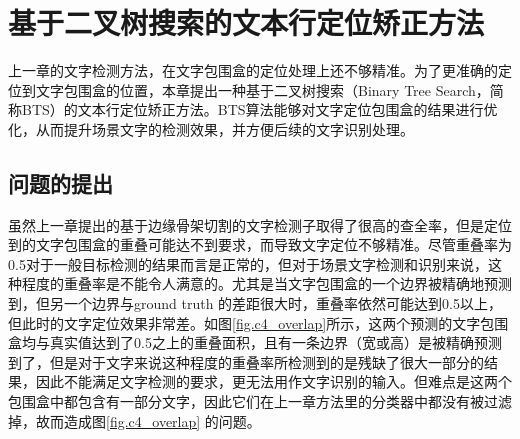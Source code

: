 ﻿%
%
%
%
%
%

\chapter{基于二叉树搜索的文本行定位矫正方法}

    上一章的文字检测方法，在文字包围盒的定位处理上还不够精准。为了更准确的定位到文字包围盒的位置，本章提出一种基于二叉树搜索（Binary Tree Search，简称BTS）的文本行定位矫正方法。BTS算法能够对文字定位包围盒的结果进行优化，从而提升场景文字的检测效果，并方便后续的文字识别处理。

    \section{问题的提出}

    虽然上一章提出的基于边缘骨架切割的文字检测子取得了很高的查全率，但是定位到的文字包围盒的重叠可能达不到要求，而导致文字定位不够精准。尽管重叠率为0.5对于一般目标检测的结果而言是正常的，但对于场景文字检测和识别来说，这种程度的重叠率是不能令人满意的。尤其是当文字包围盒的一个边界被精确地预测到，但另一个边界与ground truth 的差距很大时，重叠率依然可能达到0.5以上，但此时的文字定位效果非常差。如图\ref{fig.c4_overlap}所示，这两个预测的文字包围盒均与真实值达到了0.5之上的重叠面积，且有一条边界（宽或高）是被精确预测到了，但是对于文字来说这种程度的重叠率所检测到的是残缺了很大一部分的结果，因此不能满足文字检测的要求，更无法用作文字识别的输入。但难点是这两个包围盒中都包含有一部分文字，因此它们在上一章方法里的分类器中都没有被过滤掉，故而造成图\ref{fig.c4_overlap} 的问题。

